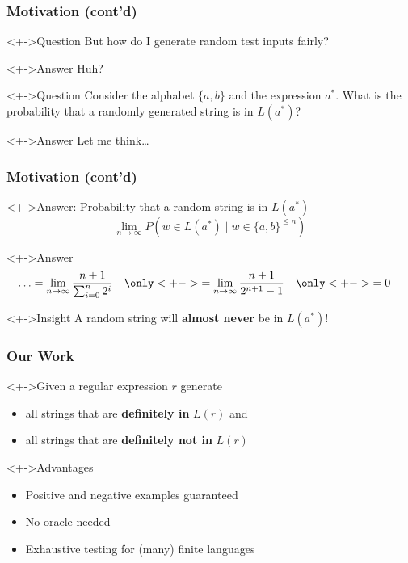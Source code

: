 \documentclass[pdftex,aspectratio=169]{beamer}
\begin{document}
\begin{frame}
  \frametitle{Motivation (cont'd)}
  \begin{block}<+->{Question}
    But how do I generate random test inputs fairly?
  \end{block}
  \begin{exampleblock}<+->{Answer}
    Huh?
  \end{exampleblock}
  \begin{block}<+->{Question}
    Consider the alphabet $\{a,b\}$ and the expression $a^*$. What is
    the probability that a randomly generated string is in $L (a^*)$?
  \end{block}
  \begin{exampleblock}<+->{Answer}
    Let me think\dots
  \end{exampleblock}
\end{frame}
\begin{frame}
  \frametitle{Motivation (cont'd)}
  \begin{exampleblock}<+->{Answer: Probability that a random string is in $L(a^*)$}
    \begin{displaymath}
      \lim_{n\to\infty} P (w \in L(a^*) \mid w \in \{a,b\}^{\le n})
    \end{displaymath}
  \end{exampleblock}
  \begin{exampleblock}<+->{Answer}
    \vspace{-\baselineskip}
    \begin{align*}
      \dots&= \lim_{n\to\infty} \frac{n+1}{\sum_{i=0}^n 2^i } &
      &\only<+->{= \lim_{n\to\infty} \frac{n+1}{ 2^{n+1} -1 }}  &
      &\only<+->{=0}
    \end{align*}
  \end{exampleblock}
  \begin{block}<+->{Insight}
    A random string will \textbf{almost never} be in $L(a^*)$!
  \end{block}
\end{frame}
\begin{frame}
  \frametitle{Our Work}
  \begin{block}<+->{Given a regular expression $r$ generate}
    \begin{itemize}
    \item all strings that are \textbf{definitely in} $L(r)$ and
    \item all strings that are \textbf{definitely not in} $L(r)$
    \end{itemize}
  \end{block}
  \begin{block}<+->{Advantages}
    \begin{itemize}
    \item Positive and negative examples guaranteed 
    \item No oracle needed
    \item Exhaustive testing for (many) finite languages
    \end{itemize}
  \end{block}
\end{frame}
\end{document}
